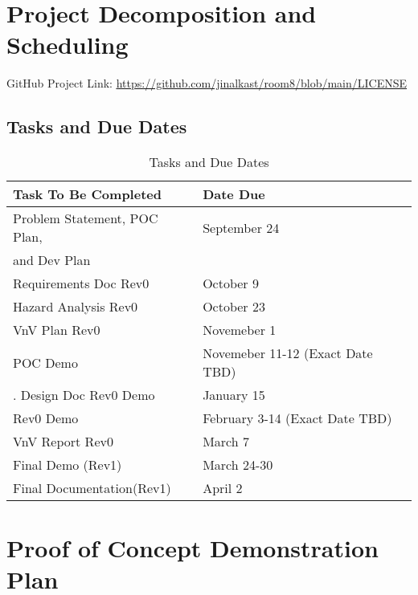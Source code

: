 \documentclass{article}
\begin{document}
\section{Project Decomposition and Scheduling}
GitHub Project Link: \href{https://github.com/jinalkast/room8/blob/main/LICENSE}{\underline{https://github.com/jinalkast/room8/blob/main/LICENSE}} 
\subsection{Tasks and Due Dates}

\begin{table}[H]
\caption{Tasks and Due Dates}
\label{tab:due-dates}
\begin{tabular}{|l|l|}
\hline
\textbf{Task To Be Completed} & \textbf{Date Due} \\ \hline
Problem Statement, POC Plan, & September 24 \\ 
and Dev Plan & \\ \hline
Requirements Doc Rev0 & October 9 \\ \hline
Hazard Analysis Rev0 & October 23 \\ \hline
VnV Plan Rev0 & Novemeber 1 \\ \hline
POC Demo & Novemeber 11-12 (Exact Date TBD) \\ \hline.
Design Doc Rev0 Demo & January 15 \\ \hline
Rev0 Demo & February 3-14 (Exact Date TBD) \\ \hline
VnV Report Rev0 & March 7 \\ \hline
Final Demo (Rev1) & March 24-30\\ \hline
Final Documentation(Rev1) & April 2 \\ \hline
\end{tabular}
\end{table}

\section{Proof of Concept Demonstration Plan}
\end{document}
